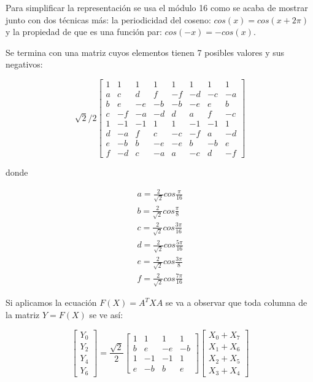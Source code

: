{Para simplificar la representación se usa el módulo 16 como se acaba de mostrar junto con dos técnicas más: la periodicidad del coseno: $cos(x) = cos(x + 2\pi)$ y la propiedad de que es una función par: $cos(-x) = -cos(x)$.

Se termina con una matriz cuyos elementos tienen 7 posibles valores y sus negativos:

\begin{equation}
    \label{eq:dct-matrix-simple}
    \sqrt{2}/2
    \begin{bmatrix}
        1 & 1 & 1 & 1 & 1 & 1 & 1 & 1  \\
        a & c & d & f & -f & -d & -c & -a \\
        b & e & -e & -b & -b & -e & e & b \\
        c & -f & -a & -d & d & a & f & -c \\
        1 & -1 & -1 & 1 & 1 & -1 & -1 & 1\\
        d & -a & f & c & -c & -f & a & -d \\
        e & -b & b & -e & -e & b & -b & e \\
        f & -d & c & -a & a & -c & d & -f
    \end{bmatrix}
\end{equation}

donde

\begin{eqnarray*}
    a = \frac{2}{\sqrt{2}}cos\frac{\pi}{16}\\
    b = \frac{2}{\sqrt{2}}cos\frac{\pi}{8}\\
    c = \frac{2}{\sqrt{2}}cos\frac{3\pi}{16}\\
    d = \frac{2}{\sqrt{2}}cos\frac{5\pi}{16}\\
    e = \frac{2}{\sqrt{2}}cos\frac{3\pi}{8}\\
    f = \frac{2}{\sqrt{2}}cos\frac{7\pi}{16}
\end{eqnarray*}

Si aplicamos la ecuación $F(X) = A^{T}XA$ se va a observar que toda columna de la matriz $Y = F(X)$ se ve así:

\begin{equation}
    \label{eq:dct-row}
    \begin{bmatrix}
        Y_0 \\
        Y_2 \\
        Y_4 \\
        Y_6
    \end{bmatrix}
    = \frac{\sqrt{2}}{2} \begin{bmatrix}
        1 & 1 & 1 & 1  \\
        b & e & -e & -b \\
        1 & -1 & -1 & 1  \\
        e & -b & b & e
        \end {bmatrix} \begin {bmatrix}
        X_0 + X_7 \\
        X_1 + X_6 \\
        X_2 + X_5 \\
        X_3 + X_4
        \end {bmatrix}
\end{equation}

}
